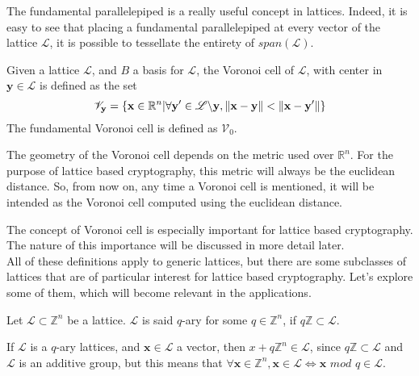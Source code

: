 \begin{remark}
The fundamental parallelepiped is a really useful concept in lattices. Indeed, it is easy to see that placing a fundamental parallelepiped at every vector of the lattice $\mathscr{L}$, it is possible to tessellate the entirety of $span(\mathscr{L})$.
\end{remark}

\begin{definition}
Given a lattice $\mathscr{L}$, and $B$ a basis for $\mathscr{L}$, the Voronoi cell of $\mathscr{L}$, with center in $\mathbf{y}\in\mathscr{L}$ is defined as the set
\begin{equation*}
\mathscr{V}_\mathbf{y} = \{\mathbf{x}\in\mathbb{R}^n|\forall \mathbf{y}' \in \mathscr{L}\backslash\mathbf{y}, \left\lVert \mathbf{x}-\mathbf{y} \right\rVert < \left\lVert \mathbf{x}-\mathbf{y}' \right\rVert \}
\end{equation*}
The fundamental Voronoi cell is defined as $\mathscr{V}_0$. 
\end{definition}

\begin{remark}
The geometry of the Voronoi cell depends on the metric used over $\mathbb{R}^n$. For the purpose of lattice based cryptography, this metric will always be the euclidean distance. So, from now on, any time a Voronoi cell is mentioned, it will be intended as the Voronoi cell computed using the euclidean distance.
\end{remark}

The concept of Voronoi cell is especially important for lattice based cryptography. The nature of this importance will be discussed in more detail later.\\
All of these definitions apply to generic lattices, but there are some subclasses of lattices that are of particular interest for lattice based cryptography. Let's explore some of them, which will become relevant in the applications.

\begin{definition}
Let $\mathscr{L}\subset\mathbb{Z}^n$ be a lattice. $\mathscr{L}$ is said $q$-ary for some $q\in\mathbb{Z}^n$, if $q\mathbb{Z}\subset\mathscr{L}$.
\end{definition} 

\begin{remark}
If $\mathscr{L}$ is a $q$-ary lattices, and $\mathbf{x}\in\mathscr{L}$ a vector, then $x+q\mathbb{Z}^n\in\mathscr{L}$, since $q\mathbb{Z}\subset\mathscr{L}$ and $\mathscr{L}$ is an additive group, but this means that $\forall\mathbf{x}\in\mathbb{Z}^n, \mathbf{x}\in\mathscr{L}\Leftrightarrow\mathbf{x}$ $mod$ $q\in\mathscr{L}$.
\end{remark}

